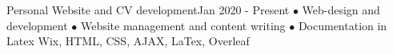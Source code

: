 \begin{projects}
   \project   
    {Personal Website and CV development}{Jan 2020 - Present}
    { }
    {$\bullet$ Web-design and development $\bullet$ Website management and content writing  $\bullet$ Documentation in Latex}
    {Wix, HTML, CSS, AJAX, LaTex, Overleaf}
        
\end{projects}